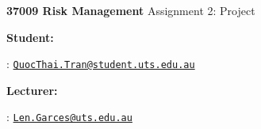 





\begin{Large}
    \textsf{\textbf{37009 Risk Management}}
    Assignment 2: Project
\end{Large}

\vspace{2ex}

\textsf{\textbf{Student:}}

: \href{mailto:QuocThai.Tran@student.uts.edu.au}{\texttt{QuocThai.Tran@student.uts.edu.au}}

\textsf{\textbf{Lecturer:}}

: \href{mailto:Len.Garces@uts.edu.au}{\texttt{Len.Garces@uts.edu.au}}

\vspace{2ex}


\newpage

\newpage

\newpage

\newpage

\newpage

% 
